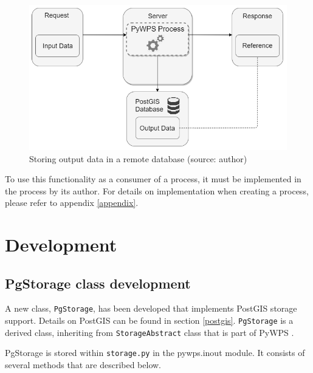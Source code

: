 \begin{figure}[H] \centering
  \includegraphics[width=350pt]{./pictures/newoption.png}
      \caption[Storing output data in a remote database]{Storing output data in a remote database (source: {author})}
      \label{fig:newoption}
  \end{figure}


To use this functionality as a consumer of a process, it must be implemented in the process by its author. For details on implementation when creating a process, please refer to appendix \ref{appendix}.


\section{Development} 

\subsection{PgStorage class development} 

A new class, \texttt{PgStorage}, has been developed that implements
PostGIS storage support. Details on PostGIS can be found in section
 \ref{postgis}. \texttt{PgStorage} is a derived class, inheriting from
\texttt{StorageAbstract} class that is part of PyWPS .

PgStorage is stored within \texttt{storage.py} in the pywps.inout
module. It consists of several methods that are described below.

